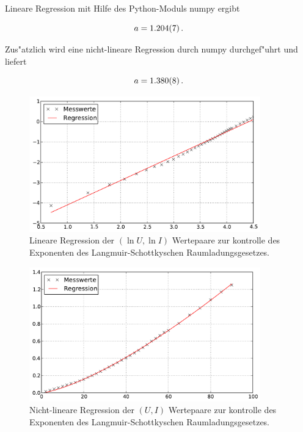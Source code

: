 		Lineare Regression mit Hilfe des Python-Moduls numpy ergibt

		\begin{equation*}
			a = \SI{1.204 (7)}{}\,.
		\end{equation*}

		Zus"atzlich wird eine nicht-lineare Regression durch numpy durchgef"uhrt und liefert

		\begin{equation*}
			a = \SI{1.380 (8)}{}\,.
		\end{equation*}

		\clearpage

		\begin{figure}[h]
			\centering
			\includegraphics[width = 10cm]{img/langmuir.pdf}
			\caption{Lineare Regression der $(\ln{U},\ln{I})$ Wertepaare zur kontrolle des Exponenten des Langmuir-Schottkyschen Raumladungsgesetzes.}
			\label{fig:langmuir}
		\end{figure}

		\begin{figure}[h]
			\centering
			\includegraphics[width = 10cm]{img/langmuir_nichtlinear.pdf}
			\caption{Nicht-lineare Regression der $(U,I)$ Wertepaare zur kontrolle des Exponenten des Langmuir-Schottkyschen Raumladungsgesetzes.}
			\label{fig:langmuir_nichtlinear}
		\end{figure}

